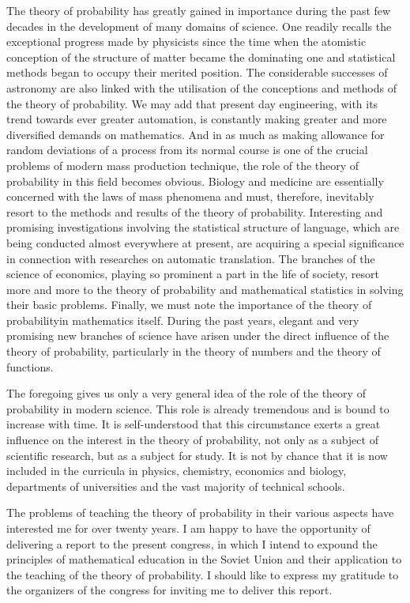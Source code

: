 The theory of probability has greatly gained in importance during the
past few decades in the development of many domains  of science. One
readily recalls the exceptional progress made by physicists since the
time when the atomistic conception of the structure of matter became
the dominating one and statistical methods began to occupy their
merited position. The considerable successes of astronomy are also
linked with the utilisation of the conceptions and methods of the
theory of probability. We may add that present day engineering, with
its trend towards ever greater automation, is constantly making greater
and more diversified demands on mathematics. And in as much as making
allowance for random deviations of a process from its normal course is
one of the crucial problems of modern mass production technique, the
role of the theory of probability in this field becomes
obvious. Biology and medicine are essentially concerned with the laws
of mass phenomena and must, therefore, inevitably resort to the
methods and results of the theory of probability. Interesting and
promising investigations involving the statistical structure of
language, which are being conducted almost everywhere at present, are
acquiring a special significance in connection with researches on
automatic translation. The branches of the science of economics,
playing so prominent a part in the life of society, resort more and
more to the theory of probability and mathematical statistics in
solving their basic  problems. Finally, we must note the importance of
the theory of probability\pageoriginale in mathematics itself. During
the past years, elegant and very promising new branches of science
have arisen under the direct influence of the theory of probability,
particularly in the theory of numbers and the theory of functions.

The foregoing gives us only a very general idea of the role of the
theory of probability in modern science. This role is already
tremendous and is bound to increase with time. It is self-understood
that this circumstance exerts a great influence on the interest in the
theory of probability, not only as a subject of scientific research,
but as a subject for study. It is not by chance that it is now
included in the curricula in physics, chemistry, economics and
biology, departments of universities and the vast majority of
technical schools.

The problems of teaching the theory of probability in their various
aspects have interested me for over twenty years. I am happy to have
the opportunity of delivering a report to the present congress, in
which I intend to expound the principles of mathematical education in
the Soviet Union and their application to the teaching of the theory
of probability. I should like to express my gratitude to  the
organizers of the congress for inviting me to deliver this report.

